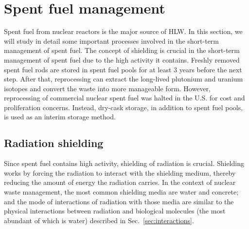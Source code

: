 \documentclass[nofootinbib,preprint,aps]{revtex4-1}
\begin{document}
    \section{Spent fuel management}
    \label{sec:temp}
    Spent fuel from nuclear reactors is the major source of HLW.
    In this section, we will study in detail some important processes involved in the short-term management
    of spent fuel.
    The concept of shielding is crucial in the short-term management of spent fuel due to the high activity
    it contains. Freshly removed spent fuel rods are stored in spent fuel pools for at least $3$ years before
    the next step. After that, reprocessing can extract the long-lived plutonium and uranium isotopes and
    convert the waste into more manageable form. However, reprocessing of commercial
    nuclear spent fuel was halted in the U.S. for cost and proliferation concerns. Instead, dry-cask
    storage, in addition to spent fuel pools, is used as an interim storage method.
    \subsection{Radiation shielding}
    Since spent fuel contains high activity, shielding of radiation is crucial. Shielding works by
    forcing the radiation to interact with the shielding medium, thereby reducing the amount of energy
    the radiation carries. In the context of nuclear waste management, the most common shielding media
    are water and concrete; and the mode of interactions of radiation with those media are similar to
    the physical interactions between radiation and biological molecules (the most abundant of which is
    water) described in Sec.~\ref{sec:interactions}.
\end{document}
